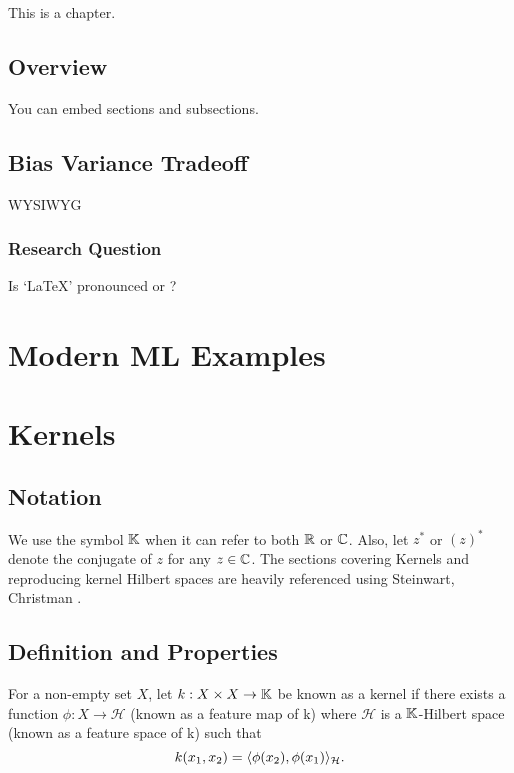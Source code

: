 \documentclass[twoside]{memoir}
\newcommand{\phonet}[1]{\textipa{[#1]}}
\begin{document}
This is a chapter.

\section{Overview}

You can embed sections and subsections.

\section{Bias Variance Tradeoff}
WYSIWYG

\subsection{Research Question}

Is `\LaTeX' pronounced \phonet{let\super hEk\super h} or \phonet{lat\super hEk\super h}?

\chapter{Modern ML Examples}
	
\chapter{Kernels}
	\section{Notation}
	We use the symbol $\mathbb{K}$  when it can refer to both $\mathbb{R}$ or $\mathbb{C}$. Also, let $z^*$ or $(z)^*$ denote the conjugate of $z$ for any $z \in \mathbb{C}$.
	The sections covering Kernels and reproducing kernel Hilbert spaces are heavily referenced using Steinwart, Christman \cite{steinwartSVM}.
	
	\section{Definition and Properties}
	\begin{defn}
		For a non-empty set $X$, let $k: X \times X \rightarrow \mathbb{K}$ be known as a kernel if there exists a function $\phi: X \rightarrow \mathcal{H}$ (known as a feature map of k) where $\mathcal{H}$ is a $\mathbb{K}$-Hilbert space (known as a feature space of k) such that
		\begin{equation}
		k(x_1, x_2) = \langle\phi(x_2), \phi(x_1)\rangle_\mathcal{H}.
		\end{equation}
	\end{defn}
	
\end{document}
